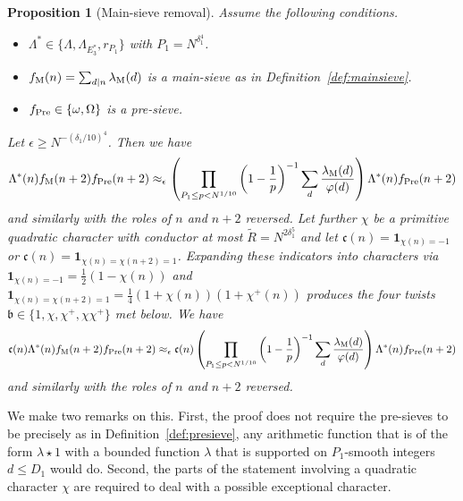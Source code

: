 \documentclass[12pt]{amsart}
\newtheorem{proposition}[theorem]{Proposition}
\theoremstyle{definition}
\theoremstyle{remark}
\numberwithin{equation}{section}
\newcommand{\1}{\mathbf{1}}
\begin{document}
\begin{proposition}[Main-sieve removal]\label{prop_MSremoval}
Assume the following conditions.
 \begin{itemize}
        \item $\Lambda^* \in \{\Lambda,\Lambda_{E_3^*},r_{P_1} \}$ with $P_1=N^{\delta_1^4}$. 
        \item $f_\textup{M}(n)=\sum_{d\mid n}\lambda_{\mathrm{M}}(d)$ is a main-sieve as in Definition~\ref{def:mainsieve}.
        \item  $f_{\textup{Pre}} \in \{\omega,\Omega\}$ is a pre-sieve.
    \end{itemize}
    Let $\epsilon \geq N^{-(\delta_1/10)^{4}}$.
		Then we have
		\begin{align*}
			\Lambda^*(n)f_{\textup{M}}(n+2) f_{\textup{Pre}}(n+2)\approx_{\epsilon} \left(\prod_{P_1\le p < N^{1/10}} \left(1-\frac{1}{p}\right)^{-1} \sum_{d}\frac{\lambda_{\mathrm{M}}(d)}{\varphi(d)}\right) \Lambda^*(n)f_{\textup{Pre}}(n+2)
		\end{align*}
		and similarly with the roles of $n$ and $n+2$ reversed.     
		Let further $\chi$ be a primitive quadratic character with conductor at most $\widetilde{R}=N^{2\delta_1^5}$ and let $\mathfrak{c}(n)=  \1_{\chi(n)=-1} $ or $\mathfrak{c}(n)=\1_{\chi(n)=\chi(n+2)=1}$. Expanding these indicators into characters via $\1_{\chi(n)=-1}=\tfrac12(1-\chi(n))$ and $\1_{\chi(n)=\chi(n+2)=1}=\tfrac14(1+\chi(n))(1+\chi^{+}(n))$ produces the four twists $\mathfrak b\in\{1,\chi,\chi^{+},\chi\chi^{+}\}$ met below.
		We have
		\begin{align*}
			\mathfrak{c}(n) \Lambda^*(n)f_{\textup{M}}(n+2)f_{\textup{Pre}}(n+2)\approx_{\epsilon} \mathfrak{c}(n)\left(\prod_{P_1\le p < N^{1/10}} \left(1-\frac{1}{p}\right)^{-1}\sum_{d}\frac{\lambda_{\mathrm{M}}(d)}{\varphi(d)}\right) \Lambda^*(n) f_{\textup{Pre}}(n+2)
		\end{align*}
		and similarly with the roles of $n$ and $n+2$ reversed.  
  \end{proposition}
  
We make two remarks on this. First, the proof does not require the pre-sieves to be precisely as in Definition~\ref{def:presieve}, any arithmetic function that is of the form $\lambda\star 1$ with a bounded function $\lambda$ that is supported on $P_1$-smooth integers $d\leq D_1$ would do. Second, the parts of the statement involving a quadratic character $\chi$ are required to deal with a possible exceptional character.
\end{document}
